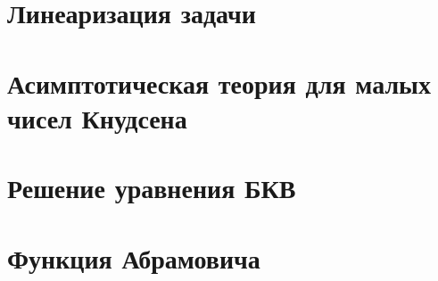 \section{Линеаризация задачи}

\section{Асимптотическая теория для малых чисел Кнудсена}

\section{Решение уравнения БКВ}

\section{Функция Абрамовича}
